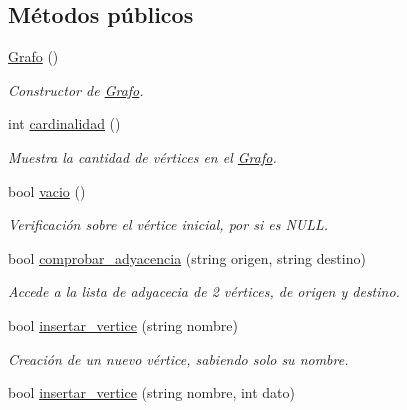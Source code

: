 \subsection*{Métodos públicos}
\begin{DoxyCompactItemize}
\item 
\mbox{\label{classGrafo_ab810bbe26a98e9af6661ccddff66b03b}} 
\hyperlink{classGrafo_ab810bbe26a98e9af6661ccddff66b03b}{Grafo} ()
\begin{DoxyCompactList}\small\item\em Constructor de \hyperlink{classGrafo}{Grafo}. \end{DoxyCompactList}\item 
\mbox{\label{classGrafo_acffb2ecb4e945a429ee650ef86c50828}} 
int \hyperlink{classGrafo_acffb2ecb4e945a429ee650ef86c50828}{cardinalidad} ()
\begin{DoxyCompactList}\small\item\em Muestra la cantidad de vértices en el \hyperlink{classGrafo}{Grafo}. \end{DoxyCompactList}\item 
\mbox{\label{classGrafo_a1b0368926f9523063c42373e7b85f71f}} 
bool \hyperlink{classGrafo_a1b0368926f9523063c42373e7b85f71f}{vacio} ()
\begin{DoxyCompactList}\small\item\em Verificación sobre el vértice inicial, por si es N\+U\+LL. \end{DoxyCompactList}\item 
bool \hyperlink{classGrafo_a7bfb0f93720820e9d0cb8091f32d69a7}{comprobar\+\_\+adyacencia} (string origen, string destino)
\begin{DoxyCompactList}\small\item\em Accede a la lista de adyacecia de 2 vértices, de \textquotesingle{}origen\textquotesingle{} y \textquotesingle{}destino\textquotesingle{}. \end{DoxyCompactList}\item 
bool \hyperlink{classGrafo_ade13f10eecc05a5a08ef43c26b53e248}{insertar\+\_\+vertice} (string nombre)
\begin{DoxyCompactList}\small\item\em Creación de un nuevo vértice, sabiendo solo su nombre. \end{DoxyCompactList}\item 
bool \hyperlink{classGrafo_a45450097c4398a0539689245784adf4a}{insertar\+\_\+vertice} (string nombre, int dato)

\end{DoxyCompactItemize}
